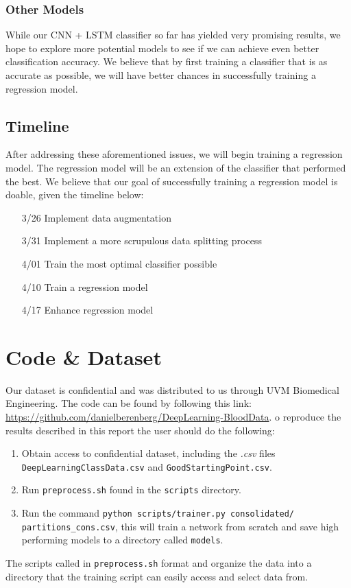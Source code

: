 \documentclass{article}
\begin{document}
{{\subsubsection*{Other Models}{While our CNN + LSTM classifier so far has yielded very promising results, we hope to explore more potential models to see if we can achieve even better classification accuracy. We believe that by first training a classifier that is as accurate as possible, we will have better chances in successfully training a regression model.}}
\subsection*{Timeline}{After addressing these aforementioned issues, we will begin training a regression model. The regression model will be an extension of the classifier that performed the best. We believe that our goal of successfully training a regression model is doable, given the timeline below:
\begin{itemize}
\item[3/26]{Implement data augmentation}
\item[3/31]{Implement a more scrupulous data splitting process}
\item[4/01]{Train the most optimal classifier possible}
\item[4/10]{Train a regression model}
\item[4/17]{Enhance regression model}
\end{itemize}}
}
\section*{Code \& Dataset}
{Our dataset is confidential and was distributed to us through UVM Biomedical Engineering. The code can be found by following this link: \href{https://github.com/danielberenberg/DeepLearning-BloodData}{https://github.com/danielberenberg/DeepLearning-BloodData}. o reproduce the results described in this report the user should do the following:
\begin{enumerate}
\item{Obtain access to confidential dataset, including the \textit{.csv} files \texttt{DeepLearningClassData.csv} and \texttt{GoodStartingPoint.csv}.}
\item{Run \texttt{preprocess.sh} found in the \texttt{scripts} directory.}
\item{Run the command \texttt{python scripts/trainer.py consolidated/ partitions\_cons.csv}, this will train a network from scratch and save high performing models to a directory called \texttt{models}.}
\end{enumerate}
The scripts called in \texttt{preprocess.sh} format and organize the data into a directory that the training script can easily access and select data from. 
}
\end{document}
